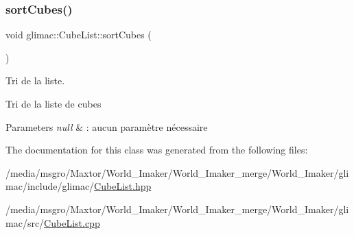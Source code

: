 \subsubsection{\texorpdfstring{sort\+Cubes()}{sortCubes()}}
{\footnotesize\ttfamily void glimac\+::\+Cube\+List\+::sort\+Cubes (\begin{DoxyParamCaption}{ }\end{DoxyParamCaption})}



Tri de la liste. 

Tri de la liste de cubes


\begin{DoxyParams}{Parameters}
{\em null} & \+: aucun paramètre nécessaire \\
\hline
\end{DoxyParams}


The documentation for this class was generated from the following files\+:\begin{DoxyCompactItemize}
\item 
/media/msgro/\+Maxtor/\+World\+\_\+\+Imaker/\+World\+\_\+\+Imaker\+\_\+merge/\+World\+\_\+\+Imaker/glimac/include/glimac/\hyperlink{CubeList_8hpp}{Cube\+List.\+hpp}\item 
/media/msgro/\+Maxtor/\+World\+\_\+\+Imaker/\+World\+\_\+\+Imaker\+\_\+merge/\+World\+\_\+\+Imaker/glimac/src/\hyperlink{CubeList_8cpp}{Cube\+List.\+cpp}\end{DoxyCompactItemize}
